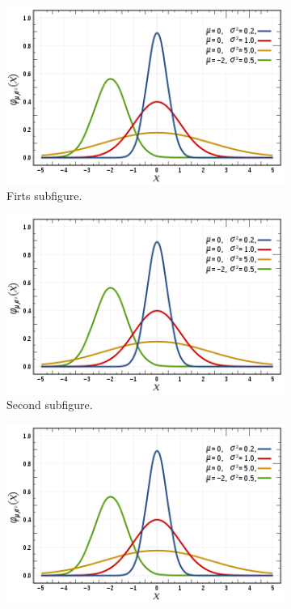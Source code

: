 \begin{figure}[!htb]
    \centering
    \begin{subfigure}{0.4\textwidth}
        \includegraphics[width=\textwidth]{figures/gambar.png}
        \caption{Firts subfigure.}
        \label{fig:first}
    \end{subfigure}
    \hfill
    \begin{subfigure}{0.4\textwidth}
        \includegraphics[width=\textwidth]{figures/gambar.png}
        \caption{Second subfigure.}
        \label{fig:second}
    \end{subfigure}
    \hfill
    \begin{subfigure}{0.4\textwidth}
        \includegraphics[width=\textwidth]{figures/gambar.png}

\end{subfigure}
\end{figure}
